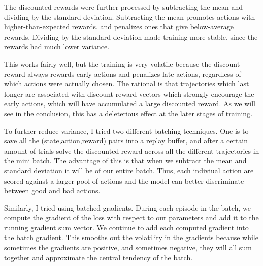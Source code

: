 \documentclass[12pt,a4paper]{article}
\begin{document}
The discounted rewards were further processed by subtracting the mean and dividing by the standard deviation. Subtracting the mean promotes actions with higher-than-expected rewards, and penalizes ones that give below-average rewards. Dividing by the standard deviation made training more stable, since the rewards had much lower variance.

This works fairly well, but the training is very volatile because the discount reward always rewards early actions and penalizes late actions, regardless of which actions were actually chosen. The rational is that trajectories which last longer are associated with discount reward vectors which strongly encourage the early actions, which will have accumulated a large discounted reward. As we will see in the conclusion, this has a deleterious effect at the later stages of training.

To further reduce variance, I tried two different batching techniques. One is to save all the (state,action,reward) pairs into a replay buffer, and after a certain amount of trials solve the discounted reward across all the different trajectories in the mini batch. The advantage of this is that when we subtract the mean and standard deviation it will be of our entire batch. Thus, each indiviual action are scored against a larger pool of actions and the model can better discriminate between good and bad actions.

Similarly, I tried using batched gradients. During each episode in the batch, we compute the gradient of the loss with respect to our parameters and add it to the running gradient sum vector. We continue to add each computed gradient into the batch gradient. This smooths out the volatility in the gradients because while sometimes the gradients are positive, and sometimes negative, they will all sum together and approximate the central tendency of the batch.
\end{document}
